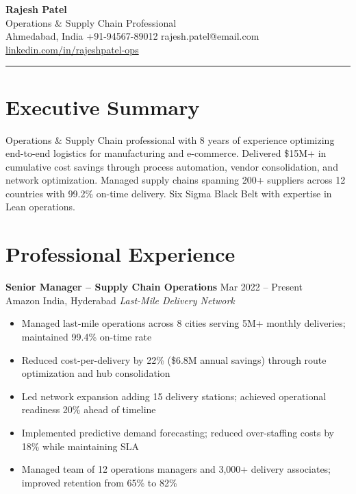 \documentclass[10pt,a4paper]{article}
\begin{document}
\begin{center}
{\fontsize{19}{23}\selectfont\bfseries\color{accent}Rajesh Patel}\\[4pt]
{\small Operations \& Supply Chain Professional}\\[4pt]
{\small Ahmedabad, India \quad\textbar\quad +91-94567-89012 \quad\textbar\quad rajesh.patel@email.com \quad\textbar\quad \href{https://linkedin.com/in/rajeshpatel-ops}{linkedin.com/in/rajeshpatel-ops}}
\end{center}
\vspace{2pt}
{\color{accent}\rule{\textwidth}{1.5pt}}

\section{Executive Summary}
Operations \& Supply Chain professional with 8 years of experience optimizing end-to-end logistics for manufacturing and e-commerce. Delivered \$15M+ in cumulative cost savings through process automation, vendor consolidation, and network optimization. Managed supply chains spanning 200+ suppliers across 12 countries with 99.2\% on-time delivery. Six Sigma Black Belt with expertise in Lean operations.

\section{Professional Experience}

\textbf{Senior Manager -- Supply Chain Operations} \hfill Mar 2022 -- Present\\
{\color{accent}Amazon India, Hyderabad} \enspace\textbar\enspace \textit{Last-Mile Delivery Network}
\begin{itemize}
  \item Managed last-mile operations across 8 cities serving 5M+ monthly deliveries; maintained 99.4\% on-time rate
  \item Reduced cost-per-delivery by 22\% (\$6.8M annual savings) through route optimization and hub consolidation
  \item Led network expansion adding 15 delivery stations; achieved operational readiness 20\% ahead of timeline
  \item Implemented predictive demand forecasting; reduced over-staffing costs by 18\% while maintaining SLA
  \item Managed team of 12 operations managers and 3,000+ delivery associates; improved retention from 65\% to 82\%
\end{itemize}
\end{document}
